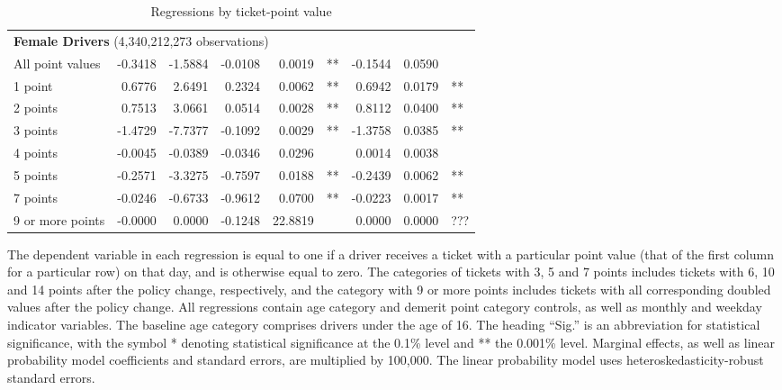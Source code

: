 \begin{table}
\begin{tabular}{l r r r r l r r l}
\hline 

\multicolumn{8}{l}{\textbf{Female Drivers} (4,340,212,273 observations)} \\ 

All point values                &  -0.3418        &  -1.5884       &  -0.0108        &  0.0019       &   **       &  -0.1544        &  0.0590       &            \\ 
1 point                         &  0.6776        &  2.6491       &  0.2324        &  0.0062       &   **       &  0.6942        &  0.0179       &   **       \\ 
2 points                        &  0.7513        &  3.0661       &  0.0514        &  0.0028       &   **       &  0.8112        &  0.0400       &   **       \\ 
3 points                        &  -1.4729        &  -7.7377       &  -0.1092        &  0.0029       &   **       &  -1.3758        &  0.0385       &   **       \\ 
4 points                        &  -0.0045        &  -0.0389       &  -0.0346        &  0.0296       &            &  0.0014        &  0.0038       &            \\ 
5 points                        &  -0.2571        &  -3.3275       &  -0.7597        &  0.0188       &   **       &  -0.2439        &  0.0062       &   **       \\ 
7 points                        &  -0.0246        &  -0.6733       &  -0.9612        &  0.0700       &   **       &  -0.0223        &  0.0017       &   **       \\ 
9 or more points                &  -0.0000        &  0.0000       &  -0.1248        &  22.8819       &            &  0.0000        &  0.0000       &  ???       \\ 

\hline 

\end{tabular} 
\caption{Regressions by ticket-point value} 
The dependent variable in each regression is equal to one  
if a driver receives a ticket with a particular point value   
(that of the first column for a particular row) on that day,  
and is otherwise equal to zero. 
The categories of tickets with 3, 5 and 7 points includes tickets  
with 6, 10 and 14 points after the policy change, respectively,  
and the category with 9 or more points includes tickets  
with all corresponding doubled values after the policy change. 
All regressions contain age category and demerit point category controls, 
as well as monthly and weekday indicator variables. 
The baseline age category comprises drivers under the age of 16. 
The heading ``Sig.'' is an abbreviation for statistical significance, with 
the symbol * denoting statistical significance at the 0.1\% level 
and ** the 0.001\% level. 
Marginal effects, as well as linear probability model coefficients and standard errors, are  
multiplied by 100,000.  
The linear probability model uses heteroskedasticity-robust standard errors.  
\label{tab:seas_Logit_vs_LPMx100K_regs_by_points} 
\end{table} 
 
